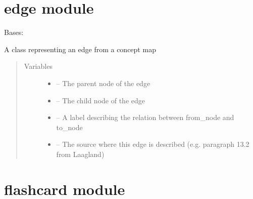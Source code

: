 \documentclass[letterpaper,10pt,english]{sphinxmanual}
\begin{document}
\chapter{edge module}
\label{\detokenize{edge:edge-module}}\label{\detokenize{edge:module-edge}}\label{\detokenize{edge::doc}}

\begin{fulllineitems}
\label{\detokenize{edge:edge.Edge}}
Bases: 

A class representing an edge from a concept map
\begin{quote}\begin{description}
\item[{Variables}] \leavevmode\begin{itemize}
\item {} 
 -- The parent node of the edge

\item {} 
 -- The child node of the edge

\item {} 
 -- A label describing the relation between from\_node and to\_node

\item {} 
 -- The source where this edge is described (e.g. paragraph 13.2 from Laagland)

\end{itemize}

\end{description}\end{quote}

\end{fulllineitems}



\chapter{flashcard module}
\label{\detokenize{flashcard:flashcard-module}}\label{\detokenize{flashcard:module-flashcard}}\label{\detokenize{flashcard::doc}}
\end{document}
